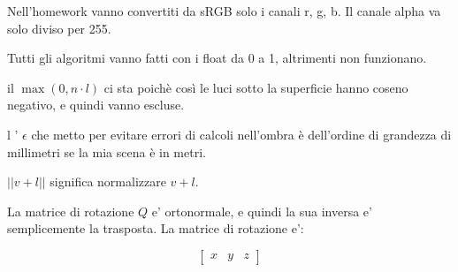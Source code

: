 




Nell'homework vanno convertiti da sRGB solo i canali r, g, b.
Il canale alpha va solo diviso per 255.

Tutti gli algoritmi vanno fatti con i float da 0 a 1, altrimenti non funzionano.


\bigbreak

il $ \max(0, n \cdot l) $ ci sta poichè così le luci sotto la superficie hanno coseno negativo, e quindi vanno escluse.

l ' $\epsilon$ che metto per evitare errori di calcoli nell'ombra è dell'ordine di grandezza di millimetri se la mia scena è in metri.

$ || v + l || $ significa normalizzare $ v + l $.



\bigbreak


La matrice di rotazione $Q$ e' ortonormale, e quindi la sua inversa e' semplicemente la trasposta.
La matrice di rotazione e':

\[
    \begin{bmatrix}
        x & y & z
    \end{bmatrix}
\]



